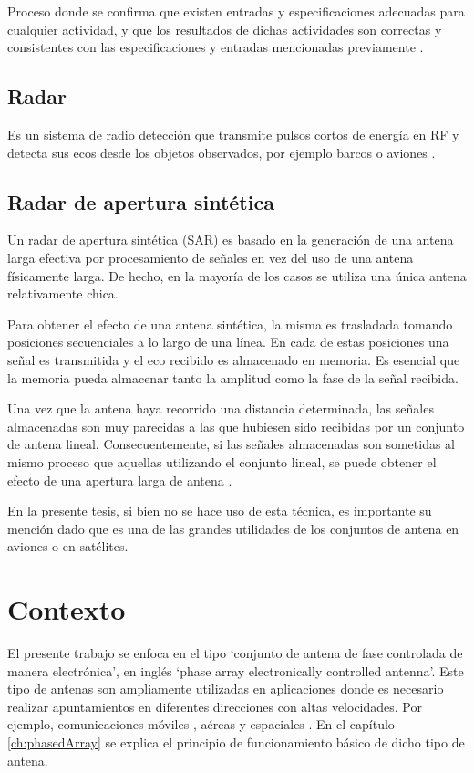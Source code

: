 Proceso donde se confirma que existen entradas y especificaciones adecuadas para cualquier actividad,
y que los resultados de dichas actividades son correctas y consistentes con las especificaciones y entradas mencionadas 
previamente \cite{Division2009}.

\subsection{Radar}

Es un sistema de radio detección que transmite pulsos cortos de energía en RF y detecta sus ecos desde los objetos observados,
por ejemplo barcos o aviones \cite{Standard1996}.

\subsection{Radar de apertura sintética}

Un radar de apertura sintética (SAR) es basado en la generación de una antena larga efectiva por procesamiento de señales en
vez del uso de una antena físicamente larga. De hecho, en la mayoría de los casos se utiliza una única antena relativamente 
chica.

Para obtener el efecto de una antena sintética, la misma es trasladada tomando posiciones secuenciales a lo largo de una línea. 
En cada de estas posiciones una señal es transmitida y el eco recibido es almacenado en memoria. Es esencial que la memoria
pueda almacenar tanto la amplitud como la fase de la señal recibida.

Una vez que la antena haya recorrido una distancia determinada, las señales almacenadas son muy parecidas a las que hubiesen
sido recibidas por un conjunto de antena lineal. Consecuentemente, si las señales almacenadas son sometidas al mismo proceso que
aquellas utilizando el conjunto lineal, se puede obtener el efecto de una apertura larga de antena \cite{Skolnik1990}.  

En la presente tesis, si bien no se hace uso de esta técnica, es importante su mención dado que es una de las grandes utilidades 
de los conjuntos de antena en aviones o en satélites.

\section{Contexto} \label{sc:context}

El presente trabajo se enfoca en el tipo \enquote*{conjunto de antena de fase controlada de manera electrónica}, en inglés
\enquote*{phase array electronically controlled antenna}. Este tipo de antenas son ampliamente utilizadas en aplicaciones donde 
es necesario realizar apuntamientos en diferentes direcciones con altas velocidades. Por ejemplo, comunicaciones móviles 
\cite{Chen2012}, aéreas \cite{MHong1989} y espaciales \cite{Shimada1995}\cite{Makhoul2012}. En el capítulo \ref{ch:phasedArray}
se explica el principio de funcionamiento básico de dicho tipo de antena.


